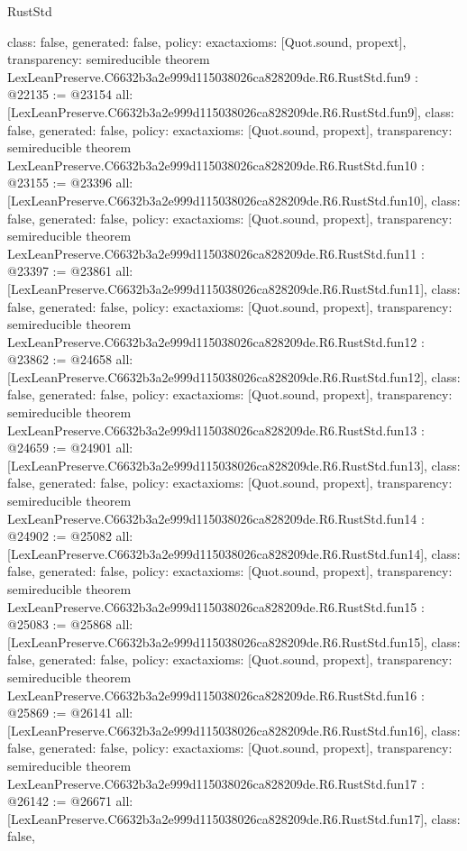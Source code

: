 \begin{lexlean}{RustStd}
\begin{coremodule}
{  class: false,
  generated: false,
  policy: exact{axioms: [Quot.sound, propext]},
  transparency: semireducible
}
theorem LexLeanPreserve.C6632b3a2e999d115038026ca828209de.R6.RustStd.fun9 : @22135 := @23154 {
  all: [LexLeanPreserve.C6632b3a2e999d115038026ca828209de.R6.RustStd.fun9],
  class: false,
  generated: false,
  policy: exact{axioms: [Quot.sound, propext]},
  transparency: semireducible
}
theorem LexLeanPreserve.C6632b3a2e999d115038026ca828209de.R6.RustStd.fun10 : @23155 := @23396 {
  all: [LexLeanPreserve.C6632b3a2e999d115038026ca828209de.R6.RustStd.fun10],
  class: false,
  generated: false,
  policy: exact{axioms: [Quot.sound, propext]},
  transparency: semireducible
}
theorem LexLeanPreserve.C6632b3a2e999d115038026ca828209de.R6.RustStd.fun11 : @23397 := @23861 {
  all: [LexLeanPreserve.C6632b3a2e999d115038026ca828209de.R6.RustStd.fun11],
  class: false,
  generated: false,
  policy: exact{axioms: [Quot.sound, propext]},
  transparency: semireducible
}
theorem LexLeanPreserve.C6632b3a2e999d115038026ca828209de.R6.RustStd.fun12 : @23862 := @24658 {
  all: [LexLeanPreserve.C6632b3a2e999d115038026ca828209de.R6.RustStd.fun12],
  class: false,
  generated: false,
  policy: exact{axioms: [Quot.sound, propext]},
  transparency: semireducible
}
theorem LexLeanPreserve.C6632b3a2e999d115038026ca828209de.R6.RustStd.fun13 : @24659 := @24901 {
  all: [LexLeanPreserve.C6632b3a2e999d115038026ca828209de.R6.RustStd.fun13],
  class: false,
  generated: false,
  policy: exact{axioms: [Quot.sound, propext]},
  transparency: semireducible
}
theorem LexLeanPreserve.C6632b3a2e999d115038026ca828209de.R6.RustStd.fun14 : @24902 := @25082 {
  all: [LexLeanPreserve.C6632b3a2e999d115038026ca828209de.R6.RustStd.fun14],
  class: false,
  generated: false,
  policy: exact{axioms: [Quot.sound, propext]},
  transparency: semireducible
}
theorem LexLeanPreserve.C6632b3a2e999d115038026ca828209de.R6.RustStd.fun15 : @25083 := @25868 {
  all: [LexLeanPreserve.C6632b3a2e999d115038026ca828209de.R6.RustStd.fun15],
  class: false,
  generated: false,
  policy: exact{axioms: [Quot.sound, propext]},
  transparency: semireducible
}
theorem LexLeanPreserve.C6632b3a2e999d115038026ca828209de.R6.RustStd.fun16 : @25869 := @26141 {
  all: [LexLeanPreserve.C6632b3a2e999d115038026ca828209de.R6.RustStd.fun16],
  class: false,
  generated: false,
  policy: exact{axioms: [Quot.sound, propext]},
  transparency: semireducible
}
theorem LexLeanPreserve.C6632b3a2e999d115038026ca828209de.R6.RustStd.fun17 : @26142 := @26671 {
  all: [LexLeanPreserve.C6632b3a2e999d115038026ca828209de.R6.RustStd.fun17],
  class: false,
}
\end{coremodule}
\end{lexlean}
